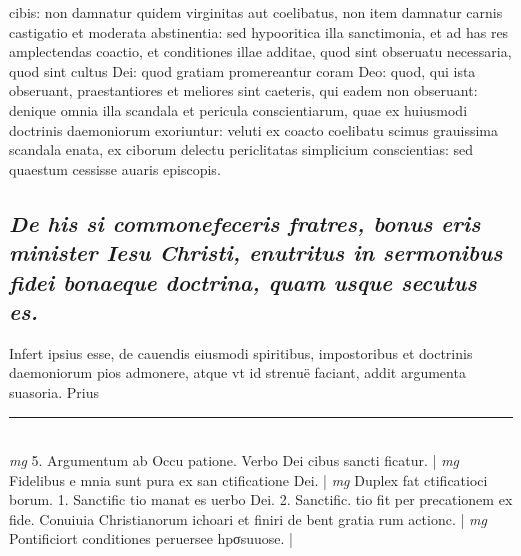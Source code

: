 \documentclass{article}
\begin{document}
\begin{pages}
cibis: non damnatur quidem virginitas aut coelibatus, non item damnatur carnis castigatio et moderata abstinentia: sed hypooritica illa sanctimonia, et ad has res amplectendas coactio, et conditiones illae additae, quod sint obseruatu necessaria, quod sint cultus Dei: quod gratiam promereantur coram Deo: quod, qui ista obseruant, praestantiores et meliores sint caeteris, qui eadem non obseruant: denique omnia illa scandala et pericula conscientiarum, quae ex huiusmodi doctrinis daemoniorum exoriuntur: veluti ex coacto coelibatu scimus grauissima scandala enata, ex ciborum delectu periclitatas simplicium conscientias: sed quaestum cessisse auaris episcopis.  \pend
{}
{}
\subsection*{\textit{De his si commonefeceris fratres, bonus eris minister Iesu Christi, enutritus in sermonibus fidei bonaeque doctrina, quam usque secutus es. }}\pstart Infert ipsius esse, de cauendis eiusmodi spiritibus, impostoribus et doctrinis daemoniorum pios admonere, atque vt id strenuë faciant, addit argumenta suasoria. Prius  \pend
\vspace{0.5cm}\noindent
\vspace{0.2cm}\rule{1cm}{0.2pt}\\ 
\hspace{0.2cm}\textit{mg}
\footnotesize 5. Argumentum ab Occu patione. Verbo Dei cibus sancti ficatur. 
\normalsize| 
\hspace{0.2cm}\textit{mg}
\footnotesize Fidelibus e mnia sunt pura ex san ctificatione Dei. 
\normalsize| 
\hspace{0.2cm}\textit{mg}
\footnotesize Duplex fat ctificatioci borum. 1. Sanctific tio manat es uerbo Dei. 2. Sanctific. tio fit per precationem ex fide. Conuiuia Christianorum ichoari et finiri de bent gratia rum actionc. 
\normalsize| 
\hspace{0.2cm}\textit{mg}
\footnotesize Pontificiort conditiones peruersee hpσsuuose. 
\normalsize| 

\end{pages}
\end{document}
